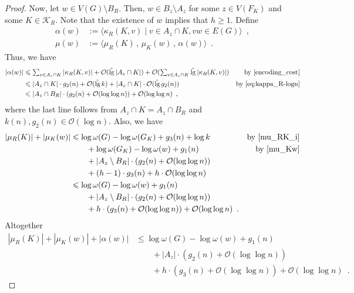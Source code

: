 \documentclass{patmorin}
\let\eqref\cref
\renewcommand{\le}{\leqslant}
\renewcommand{\geq}{\geqslant}
\renewcommand{\leq}{\leqslant}
\DeclareMathOperator{\lgg}{\hat{lg}}
\newcommand{\Oh}{\mathcal{O}}
\begin{document}
\begin{proof}
    Now, let $w\in V(G)\setminus B_R$.
    Then, $w\in B_z\setminus A_z$ for some $z\in V(F_K)$ and some $K\in\mathcal{K}_R$.
    Note that the existence of $w$ implies that $h\geq 1$.
    Define
    \begin{align*}
        \alpha(w)&:=\langle\kappa_R(K,v)\mid v\in A_z\cap K, vw\in E(G)\rangle\enspace,\\
        \mu(w) &:= \langle\mu_R(K)\,,\, \mu_K(w)\,,\, \alpha(w) \rangle \enspace .
    \end{align*}
    Thus,  we have
    \begin{align*}
        |\alpha(w)|
        &\leq \textstyle\sum_{v\in A_z\cap K} |\kappa_R(K,v)| +
        \Oh(\lgg|A_z\cap K|) + \Oh(\sum_{v\in A_z\cap K} \lgg |\kappa_R(K,v)|)
        &\textrm{by~\eqref{encoding_cost}}\\
        &\leq |A_z\cap K|\cdot g_2(n) +
        \Oh(\lgg k) + |A_z\cap K|\cdot\Oh(\lgg g_2(n))
        &\textrm{by~\eqref{eq:kappa_R-logn}}\\
        &\leq |A_z\cap B_R|\cdot (g_2(n) +\Oh(\log\log n)) + \Oh(\log\log n)\enspace,
    \end{align*}
    where the last line follows
    from $A_z\cap K= A_z\cap B_R$ and $k(n),g_2(n)\in\Oh(\log n)$.
    Also, we have
    \begin{align*}
       |\mu_R(K)|+|\mu_K(w)|
       & \le \log \omega(G) - \log\omega(G_K) + g_3(n) + \log k & \text{by~\eqref{mu_RK_i}}\\
       & \qquad {} + \log\omega(G_K) - \log\omega(w) + g_1(n) & \text{by~\eqref{mu_Kw}}\\
       & \qquad {} + |A_z\setminus B_R|\cdot (g_2(n) + \Oh(\log\log n))\\
       & \qquad {} + (h-1)\cdot g_3(n) + h\cdot\Oh(\log\log n)\\
       & \leq \log\omega(G) - \log\omega(w) + g_1(n)\\
       & \qquad {} + |A_z\setminus B_R|\cdot (g_2(n) + \Oh(\log\log n))\\
       & \qquad {} + h\cdot (g_3(n) + \Oh(\log\log n)) + \Oh(\log\log n) \enspace . \notag
    \end{align*}
    Altogether
    \begin{align*}
      |\mu_R(K)|+|\mu_K(w)|+|\alpha(w)|
        & \le \log \omega(G) - \log\omega(w) + g_1(n)\\
        & \qquad {} + |A_z|\cdot (g_2(n)+\Oh(\log\log n))\\
        & \qquad {} + h\cdot (g_3(n) + \Oh(\log\log n)) + \Oh(\log\log n)\enspace.

\end{align*}
\end{proof}
\end{document}
